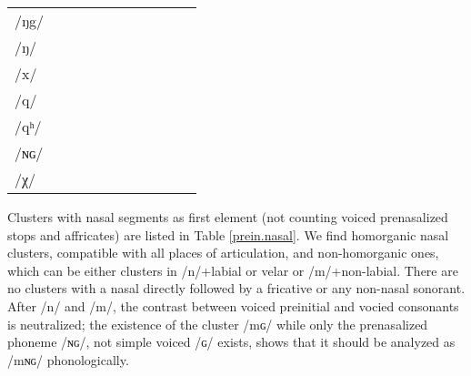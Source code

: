 \documentclass[oldfontcommands,oneside,a4paper,11pt]{article}
\newcommand{\ipa}[1]{{\phon/#1/}} %
\begin{document}
\begin{table}
{\begin{tabular}{l|lll|lll|lll|l}
\ipa{ŋg} 	& 	  	& 	  	& 	  	& 	  	& 	  	& 	& 	  	& 	  	& 	 \\  
\ipa{ŋ}	& 	  	& 	  	& 	  	& 	  	& 	  	& 	& 	  	& 	  	& 	 \\  
\ipa{x}	& 	  	& 	  	& 	  	& 	  	& 	  	& 	& 	  	& 	  	& 	 \\  
\ipa{q} 	& 	  	& 	  	& 	  	& 	  	& 	  	& 	& 	  	& 	  	& 	 \\  
\ipa{qʰ} 	& 	  	& 	  	& 	  	& 	  	& 	  	& 	& 	  	& 	  	& 	 \\  
\ipa{ɴɢ} 	& 	  	& 	  	& 	  	& 	  	& 	  	& 	& 	  	& 	  	& 	 \\  
\ipa{χ} 	& 	  	& 	  	& 	  	& 	  	& 	  	& 	& 	  	& 	  	& 	 \\  
\bottomrule
\end{tabular}}
\end{table}

Clusters with nasal segments as first element (not counting voiced prenasalized stops and affricates) are listed in Table \ref{prein.nasal}. We find homorganic nasal clusters, compatible with all places of articulation, and non-homorganic ones, which can be either clusters in \ipa{n}+labial or velar or \ipa{m}+non-labial. There are no clusters with a nasal directly followed by a fricative or any non-nasal sonorant. After \ipa{n} and \ipa{m}, the contrast between voiced preinitial and vocied consonants is neutralized; the existence of the cluster \ipa{mɢ} while only the prenasalized phoneme \ipa{ɴɢ}, not simple voiced \ipa{ɢ} exists, shows that it should be analyzed as \ipa{mɴɢ} phonologically.
\end{document}
